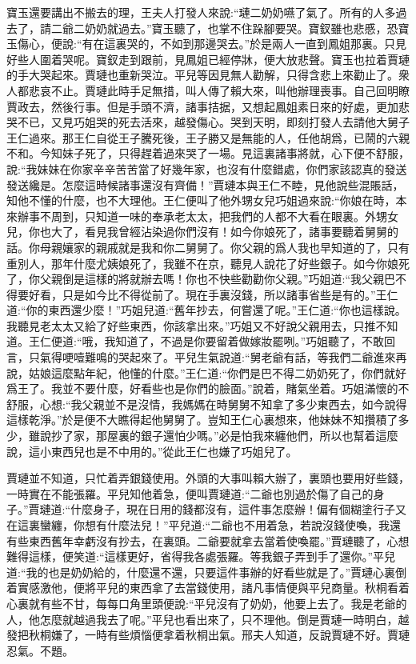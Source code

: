 \begin{parag}
    寶玉還要講出不搬去的理，王夫人打發人來說:“璉二奶奶嚥了氣了。所有的人多過去了，請二爺二奶奶就過去。”寶玉聽了，也掌不住跺腳要哭。寶釵雖也悲慼，恐寶玉傷心，便說:“有在這裏哭的，不如到那邊哭去。”於是兩人一直到鳳姐那裏。只見好些人圍着哭呢。寶釵走到跟前，見鳳姐已經停牀，便大放悲聲。寶玉也拉着賈璉的手大哭起來。賈璉也重新哭泣。平兒等因見無人勸解，只得含悲上來勸止了。衆人都悲哀不止。賈璉此時手足無措，叫人傳了賴大來，叫他辦理喪事。自己回明瞭賈政去，然後行事。但是手頭不濟，諸事拮据，又想起鳳姐素日來的好處，更加悲哭不已，又見巧姐哭的死去活來，越發傷心。哭到天明，即刻打發人去請他大舅子王仁過來。那王仁自從王子騰死後，王子勝又是無能的人，任他胡爲，已鬧的六親不和。今知妹子死了，只得趕着過來哭了一場。見這裏諸事將就，心下便不舒服，說:“我妹妹在你家辛辛苦苦當了好幾年家，也沒有什麼錯處，你們家該認真的發送發送纔是。怎麼這時候諸事還沒有齊備！”賈璉本與王仁不睦，見他說些混賬話，知他不懂的什麼，也不大理他。王仁便叫了他外甥女兒巧姐過來說:“你娘在時，本來辦事不周到，只知道一味的奉承老太太，把我們的人都不大看在眼裏。外甥女兒，你也大了，看見我曾經沾染過你們沒有！如今你娘死了，諸事要聽着舅舅的話。你母親孃家的親戚就是我和你二舅舅了。你父親的爲人我也早知道的了，只有重別人，那年什麼尤姨娘死了，我雖不在京，聽見人說花了好些銀子。如今你娘死了，你父親倒是這樣的將就辦去嗎！你也不快些勸勸你父親。”巧姐道:“我父親巴不得要好看，只是如今比不得從前了。現在手裏沒錢，所以諸事省些是有的。”王仁道:“你的東西還少麼！”巧姐兒道:“舊年抄去，何嘗還了呢。”王仁道:“你也這樣說。我聽見老太太又給了好些東西，你該拿出來。”巧姐又不好說父親用去，只推不知道。王仁便道:“哦，我知道了，不過是你要留着做嫁妝罷咧。”巧姐聽了，不敢回言，只氣得哽噎難鳴的哭起來了。平兒生氣說道:“舅老爺有話，等我們二爺進來再說，姑娘這麼點年紀，他懂的什麼。”王仁道:“你們是巴不得二奶奶死了，你們就好爲王了。我並不要什麼，好看些也是你們的臉面。”說着，賭氣坐着。巧姐滿懷的不舒服，心想:“我父親並不是沒情，我媽媽在時舅舅不知拿了多少東西去，如今說得這樣乾淨。”於是便不大瞧得起他舅舅了。豈知王仁心裏想來，他妹妹不知攢積了多少，雖說抄了家，那屋裏的銀子還怕少嗎。”必是怕我來纏他們，所以也幫着這麼說，這小東西兒也是不中用的。”從此王仁也嫌了巧姐兒了。
\end{parag}


\begin{parag}
    賈璉並不知道，只忙着弄銀錢使用。外頭的大事叫賴大辦了，裏頭也要用好些錢，一時實在不能張羅。平兒知他着急，便叫賈璉道:“二爺也別過於傷了自己的身子。”賈璉道:“什麼身子，現在日用的錢都沒有，這件事怎麼辦！偏有個糊塗行子又在這裏蠻纏，你想有什麼法兒！”平兒道:“二爺也不用着急，若說沒錢使喚，我還有些東西舊年幸虧沒有抄去，在裏頭。二爺要就拿去當着使喚罷。”賈璉聽了，心想難得這樣，便笑道:“這樣更好，省得我各處張羅。等我銀子弄到手了還你。”平兒道:“我的也是奶奶給的，什麼還不還，只要這件事辦的好看些就是了。”賈璉心裏倒着實感激他，便將平兒的東西拿了去當錢使用，諸凡事情便與平兒商量。秋桐看着心裏就有些不甘，每每口角里頭便說:“平兒沒有了奶奶，他要上去了。我是老爺的人，他怎麼就越過我去了呢。”平兒也看出來了，只不理他。倒是賈璉一時明白，越發把秋桐嫌了，一時有些煩惱便拿着秋桐出氣。邢夫人知道，反說賈璉不好。賈璉忍氣。不題。
\end{parag}


